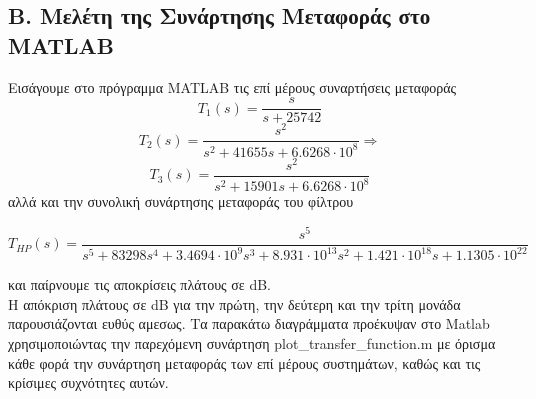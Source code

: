 \documentclass{article}
\begin{document}
{{{\subsection*{B. Μελέτη της Συνάρτησης Μεταφοράς στο MATLAB}

\large{}
Εισάγουμε στο  πρόγραμμα MATLAB τις επί μέρους συναρτήσεις μεταφοράς
 \begin{equation*}
\boxed{T_1(s) = \frac{s}{s+25742} }
\end{equation*}
\begin{equation*}
\boxed{T_2(s) = \frac{s^2}{s^2+ 41655s+ 6.6268 \cdot 10^8}} \Rightarrow
\end{equation*}
\begin{equation*}
\boxed{T_3(s) =  \frac{s^2}{s^2+ 15901s+ 6.6268 \cdot 10^8}}
\end{equation*}
αλλά και την συνολική συνάρτησης μεταφοράς του φίλτρου 
\begin{changemargin}{-1.6cm}{0.5cm}
\begin{equation*}
\boxed{T_{HP}(s) = \frac{s^5}{s^5+83298s^4+3.4694\cdot10^9s^3+8.931\cdot 10^{13}s^2 + 1.421\cdot 10^{18}s +1.1305\cdot 10^{22}}}
\end{equation*}
\end{changemargin}
και παίρνουμε τις αποκρίσεις πλάτους σε dB. \\ Η απόκριση πλάτους σε dB για την πρώτη, την δεύτερη και την τρίτη μονάδα παρουσιάζονται ευθύς αμεσως. Τα παρακάτω διαγράμματα προέκυψαν στο Matlab χρησιμοποιώντας την παρεχόμενη συνάρτηση plot\_transfer\_function.m με όρισμα κάθε φορά την συνάρτηση μεταφοράς των επί μέρους συστημάτων, καθώς και τις κρίσιμες συχνότητες αυτών. 
\\[2.4\baselineskip]

\newpage
}}}
\end{document}
